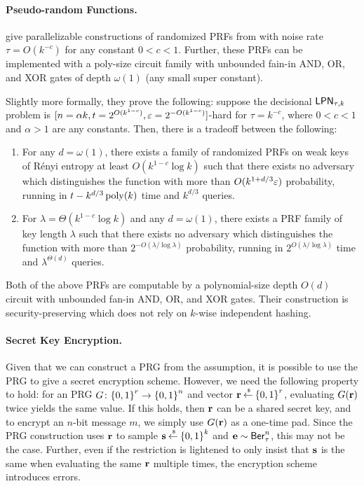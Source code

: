 \paragraph{Pseudo-random Functions.} \cite{C:YuZha16} give parallelizable constructions of randomized PRFs from \LPN with noise rate $\tau = O(k^{-c})$ for any constant $0 < c < 1$.
Further, these PRFs can be implemented with a poly-size circuit family with unbounded fain-in AND, OR, and XOR gates of depth $\omega(1)$ (any small super constant).

Slightly more formally, they prove the following: suppose the decisional $\mathsf{LPN}_{\tau,k}$ problem is $[n=\alpha k, t=2^{O(k^{1-c})}, \varepsilon=2^{-O(k^{1-c})}]$-hard for $\tau = k^{-c}$, where $0 < c < 1$ and $\alpha > 1$ are any constants.
Then, there is a tradeoff between the following:
\begin{enumerate}
	\item For any $d = \omega(1)$, there exists a family of randomized PRFs on weak keys of R\'{e}nyi entropy at least $O(k^{1-c}\log k)$ such that there exists no adversary which distinguishes the function with more than $O(k^{1+d/3}\varepsilon)$ probability, running in $t-k^{d/3}\operatorname{poly}(k)$ time and $k^{d/3}$ queries.
	
	\item For $\lambda = \Theta(k^{1-c}\log k)$ and any $d = \omega(1)$, there exists a PRF family of key length $\lambda$ such that there exists no adversary which distinguishes the function with more than $2^{-O(\lambda/\log \lambda)}$ probability, running in $2^{O(\lambda/\log\lambda)}$ time and $\lambda^{\Theta(d)}$ queries.
\end{enumerate}
Both of the above PRFs are computable by a polynomial-size depth $O(d)$ circuit with unbounded fan-in AND, OR, and XOR gates.
Their construction is security-preserving which does not rely on $k$-wise independent hashing.

\paragraph{Secret Key Encryption.} Given that we can construct a PRG from the \LPN assumption, it is possible to use the PRG to give a secret encryption scheme.
However, we need the following property to hold: for an \LPN PRG $G \colon {\{0,1\}}^r \rightarrow {\{0,1\}}^n$ and vector ${\mathbf r} \mathbin{\stackrel{\mbox{\,\tiny \$}}{\gets}} {\{0,1\}}^r$, evaluating $G({\mathbf r})$ twice yields the same value.
If this holds, then ${\mathbf r}$ can be a shared secret key, and to encrypt an $n$-bit message $m$, we simply use $G({\mathbf r})$ as a one-time pad.
Since the PRG construction uses ${\mathbf r}$ to sample ${\mathbf s} \mathbin{\stackrel{\mbox{\,\tiny \$}}{\gets}} {\{0,1\}}^k$ and ${\mathbf e} \sim \mathsf{Ber}_\tau^n$, this may not be the case.
Further, even if the restriction is lightened to only insist that ${\mathbf s}$ is the same when evaluating the same ${\mathbf r}$ multiple times, the encryption scheme introduces errors.

